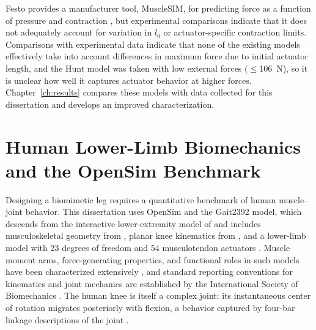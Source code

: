 Festo provides a manufacturer tool, MuscleSIM, for predicting force as a function of pressure and contraction \citep{lang_robert_musclesim_2005}, but experimental comparisons indicate that it does not adequately account for variation in $l_0$ or actuator-specific contraction limits. Comparisons with experimental data indicate that none of the existing models effectively take into account differences in maximum force due to initial actuator length, and the Hunt model was taken with low external forces ($\leq$\qty{106}{\newton}), so it is unclear how well it captures actuator behavior at higher forces. Chapter~\ref{ch:results} compares these models with data collected for this dissertation and develops an improved characterization.

\section{Human Lower-Limb Biomechanics and the OpenSim Benchmark}\label{sec:bg_biomechanics}

Designing a biomimetic leg requires a quantitative benchmark of human muscle--joint behavior. This dissertation uses OpenSim \citep{delp_opensim_2007, seth_opensim_2011, seth_opensim_2018} and the Gait2392 model, which descends from the interactive lower-extremity model of \citet{delp_interactive_1990} and includes musculoskeletal geometry from \citet{hoy_musculoskeletal_1990}, planar knee kinematics from \citet{yamaguchi_planar_1989}, and a lower-limb model with 23 degrees of freedom and 54 musculotendon actuators \citep{arnold_model_2010}. Muscle moment arms, force-generating properties, and functional roles in such models have been characterized extensively \citep{zajac_determining_1989, brand_model_1982, menegaldo_moment_2004, millard_flexing_2013, sherman_what_2013, suderman_moving_2012}, and standard reporting conventions for kinematics and joint mechanics are established by the International Society of Biomechanics \citep{wu_for_1995, wu_isb_2002, wu_isb_2005, derrick_isb_2020}. The human knee is itself a complex joint: its instantaneous center of rotation migrates posteriorly with flexion, a behavior captured by four-bar linkage descriptions of the joint \citep{romero_four-bar_2020, steele_biomimetic_2018}.

